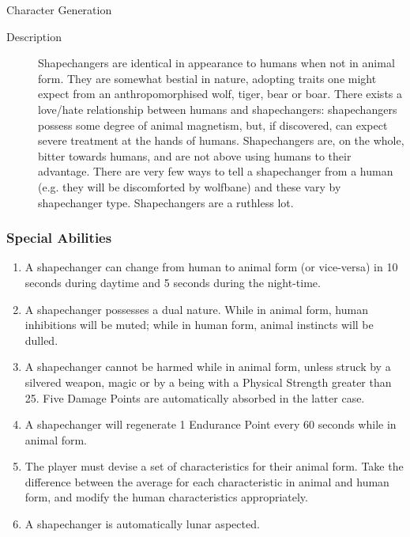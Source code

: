 \begin{Chapter}{Character Generation}
\begin{description}
\item[Description] Shapechangers are identical in appearance to humans
  when not in animal form.  They are somewhat bestial in nature,
  adopting traits one might expect from an anthropomorphised wolf,
  tiger, bear or boar.  There exists a love/hate relationship between
  humans and shapechangers: shapechangers possess some degree of
  animal magnetism, but, if discovered, can expect severe treatment at
  the hands of humans.  Shapechangers are, on the whole, bitter
  towards humans, and are not above using humans to their advantage.
  There are very few ways to tell a shapechanger from a human (e.g.
  they will be discomforted by wolfbane) and these vary by
  shapechanger type.  Shapechangers are a ruthless lot.
\end{description}

\subsubsection{Special Abilities}

\begin{enumerate}

\item A shapechanger can change from human to animal form (or
  vice-versa) in 10 seconds during daytime and 5 seconds during the
  night-time.

\item A shapechanger possesses a dual nature.  While in animal form,
  human inhibitions will be muted; while in human form, animal
  instincts will be dulled.

\item A shapechanger cannot be harmed while in animal form, unless
  struck by a silvered weapon, magic or by a being with a Physical
  Strength greater than 25.  Five Damage Points are automatically
  absorbed in the latter case.

\item A shapechanger will regenerate 1 Endurance Point every 60
  seconds while in animal form.

\item The player must devise a set of characteristics for their animal
  form. Take the difference between the average for each
  characteristic in animal and human form, and modify the human
  characteristics appropriately.

\item A shapechanger is automatically lunar aspected.


\end{enumerate}
\end{Chapter}
